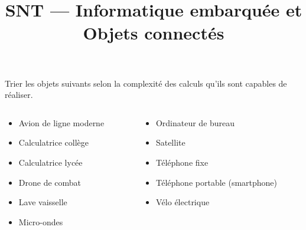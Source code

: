\documentclass[17pt, aspectratio=43]{beamer}
\title{SNT --- Informatique embarquée et Objets connectés}
\begin{document}
\begin{frame}
  Trier les objets suivants selon la complexité des calculs qu'ils sont capables de réaliser.

  \begin{columns}
    \begin{column}{.5\linewidth}
  \begin{itemize}
    \item Avion de ligne moderne
    \item Calculatrice collège
    \item Calculatrice lycée
    \item Drone de combat
    \item Lave vaisselle
    \item Micro-ondes
  \end{itemize}
    \end{column}
    \begin{column}{.5\linewidth}
  \begin{itemize}
    \item Ordinateur de bureau
    \item Satellite
    \item Téléphone fixe
    \item Téléphone portable (smartphone)
    \item Vélo électrique
  \end{itemize}
    \end{column}
  \end{columns}
\end{frame}
\end{document}
